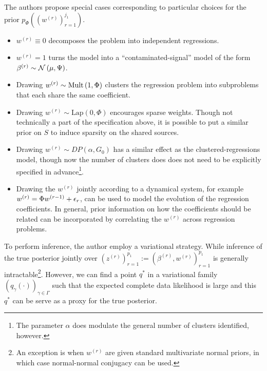 \documentclass[14pt]{extarticle}
\begin{document}
The authors propose special cases corresponding to particular choices for the
prior $p_{\Phi}\left(\left(w^{(r)}\right)_{r = 1}^{j_{1}}\right)$.
\begin{itemize}
  \item $w^{(r)} \equiv 0$ decomposes the problem into independent regressions.
  \item $w^{(r)} = 1$ turns the model into a ``contaminated-signal'' model of
    the form $\beta^{(r)} \sim \mathcal{N}\left(\mu, \Psi\right)$.
  \item Drawing $w^{(r)} \sim \textnormal{Mult}\left(1, \Phi\right)$ clusters the regression
    problem into subproblems that each share the same coefficient.
  \item Drawing $w^{(r)} \sim \text{Lap}\left(0, \Phi\right)$ encourages sparse
    weights. Though not technically a part of the specification above, it is
    possible to put a similar prior on $S$ to induce sparsity on the shared
    sources.
  \item Drawing $w^{(r)} \sim DP\left(\alpha, G_{0}\right)$ has a similar effect
    as the clustered-regressions model, though now the number of clusters does
    does not need to be explicitly specified in advance\footnote{The parameter
      $\alpha$ does modulate the general number of clusters identified,
      however.}.
  \item Drawing the $w^{(r)}$ jointly according to a dynamical system, for
    example $w^{(r)} = \Phi w^{(r - 1)} + \epsilon_{r}$, can be used to model the
    evolution of the regression coefficients. In general, prior information on
    how the coefficients should be related can be incorporated by correlating
    the $w^{(r)}$ across regression problems.
\end{itemize}

To perform inference, the author employ a variational strategy. While inference
of the true posterior jointly over $\left(z^{(r)}\right)_{r = 1}^{p_{1}} :=
\left(\beta^{(r)}, w^{(r)}\right)_{r = 1}^{p_{1}}$ is generally
intractable\footnote{An exception is when $w^{(r)}$ are given standard
  multivariate normal priors, in which case normal-normal conjugacy can be
  used.}. However, we can find a point $q^{\ast}$ in a variational family
$\left(q_{\gamma}\left(\cdot\right)\right)_{\gamma \in \Gamma}$ such that the
expected complete data likelihood is large and this $q^{\ast}$ can be serve as a
proxy for the true posterior.
\end{document}
